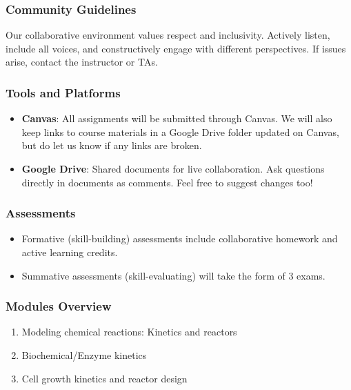 \documentclass[
]{article}
\providecommand{\tightlist}{%
  \setlength{\itemsep}{0pt}\setlength{\parskip}{0pt}}
\begin{document}
\hypertarget{community-guidelines}{%
\subsubsection{Community Guidelines}\label{community-guidelines}}

Our collaborative environment values respect and inclusivity. Actively listen, include all voices, and constructively engage with different perspectives. If issues arise, contact the instructor or TAs.

\hypertarget{tools-and-platforms}{%
\subsubsection{Tools and Platforms}\label{tools-and-platforms}}

\begin{itemize}
\tightlist
\item
  \textbf{Canvas}: All assignments will be submitted through Canvas. We will also keep links to course materials in a Google Drive folder updated on Canvas, but do let us know if any links are broken.
\item
  \textbf{Google Drive}: Shared documents for live collaboration. Ask questions directly in documents as comments. Feel free to suggest changes too!
\end{itemize}

\hypertarget{assessments}{%
\subsubsection{Assessments}\label{assessments}}

\begin{itemize}
\tightlist
\item
  Formative (skill-building) assessments include collaborative homework and active learning credits.
\item
  Summative assessments (skill-evaluating) will take the form of 3 exams.
\end{itemize}

\hypertarget{modules-overview}{%
\subsubsection{Modules Overview}\label{modules-overview}}

\begin{enumerate}
\def\labelenumi{\arabic{enumi}.}
\tightlist
\item
  Modeling chemical reactions: Kinetics and reactors
\item
  Biochemical/Enzyme kinetics\\
\item
  Cell growth kinetics and reactor design
\end{enumerate}
\end{document}
